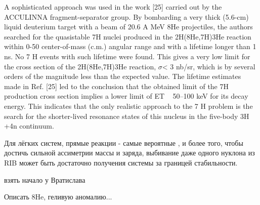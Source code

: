 A sophisticated approach was used in the work [25] carried out by the ACCULINNA fragment-separator group. 
By bombarding a very thick (5.6-cm) liquid deuterium target with a beam of 20.6 A MeV 8He projectiles, the authors searched for the quasistable 7H nuclei produced in the 2H(8He,7H)3He reaction within 0-50 center-of-mass (c.m.) angular range and with a lifetime longer than 1 ns. 
No 7 H events with such lifetime were found. 
This gives a very low limit for the cross section of the 2H(8He,7H)3He reaction, $\sigma$< 3 nb/sr, which is by several orders of the magnitude less than the expected value. 
The lifetime estimates made in Ref. [25] led to the conclusion that the obtained limit of the 7H production cross section implies a lower limit of ET ~ 50–100 keV for its decay energy. 
This indicates that the only realistic approach to the 7 H problem is the search for the shorter-lived resonance states of this nucleus in the five-body 3H +4n continuum.


Для лёгких систем, прямые реакции - самые вероятные , и более того, чтобы достичь сильной ассиметрии массы и заряда, выбивание даже одного нуклона из RIB может быть достаточно получения системы за границей стабильности.

взять начало у Вратислава

Описать 8He, геливую аномалию...